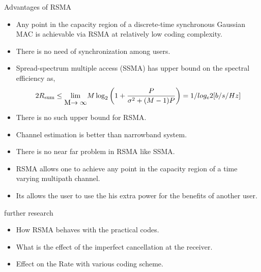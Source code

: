 \documentclass[10pt]{beamer}
\begin{document}
\begin{frame}[t]{Advantages of RSMA}
\begin{itemize}
	\item <1->Any point in the capacity region of a discrete-time synchronous Gaussian MAC is achievable via RSMA at relatively low coding complexity.
	\item <2-> There is no need of synchronization among users.
	\item<3-> Spread-spectrum multiple access (SSMA) has upper bound on the spectral efficiency as,
	\begin{equation}
 2R_{\text{sum}} \leq \stackunder{$\lim$}{M$\rightarrow \infty$} M\log_2\left( 1 + \frac{P}{\sigma^2 + (M-1)P}\right) = 1/log_e 2[ b/s/Hz]
  \end{equation}
\item <4-> There is no such upper bound for RSMA.
\end{itemize}
\end{frame}

\begin{frame}[t]
\begin{itemize}
	\item<1-> Channel estimation is better than narrowband system.
	\item<2-> There is no near far problem in RSMA like SSMA.
	\item<3-> RSMA allows one to achieve any point in the capacity region of a time varying multipath channel.
	\item<4-> Its allows the user to use the his extra power for the benefits of another user.
\end{itemize}
\end{frame}

\begin{frame}[t]{further research}
\begin{itemize}
	\item How RSMA behaves with the practical codes.
	\item What is the effect of the imperfect cancellation at the receiver.
	\item Effect on the Rate with various coding scheme.
\end{itemize}
\end{frame}
	\begin{frame}
\end{frame}	
\end{document}
